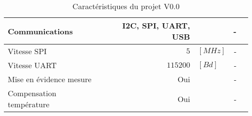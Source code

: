 \begin{table}[h]
{\begin{tabular}{|l|rlrl|}
			Communications           & I2C, SPI, UART, USB & \multicolumn{1}{l|}{}         & -                   &                   \\ \hline
			Vitesse SPI              & $5$                 & \multicolumn{1}{l|}{$[MHz]$}  & -                   &                   \\ \hline
			Vitesse UART             & $115200$            & \multicolumn{1}{l|}{$[Bd]$}   & -                   &                   \\ \hline
			Mise en évidence mesure  & Oui                 & \multicolumn{1}{l|}{}         & -                   &                   \\ \hline
			Compensation température & Oui                 & \multicolumn{1}{l|}{}         & -                   &                   \\ \hline
		\end{tabular}%
	}
	\caption{Caractéristiques du projet V0.0}
	\label{tab:Caracteristiques}
\end{table}